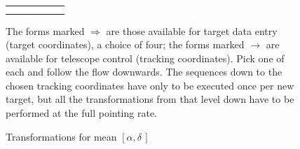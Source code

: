 \documentclass[twoside,11pt]{starlink}
\providecommand{\radec}{$[\alpha,\delta\,]$}
\begin{document}
\begin{scriptsize}
\begin{terminalv}
\begin{figure}
\begin{small}
\begin{center}
\begin{tabular}{|cccccc|}
        & & & & & \\
        & & & & & \\ \hline
      \end{tabular}
    \end{center}
  \end{small}
  \caption{Transformations for mean \radec}
  The forms marked $\Rightarrow$ are those available for target data entry (target coordinates),
  a choice of four; the forms marked $\rightarrow$ are available for telescope control (tracking
coordinates).  Pick one of each and follow the flow downwards.  The sequences down to the chosen
  tracking coordinates have only to be executed once per new target, but all the transformations
  from that level down have to be performed at the full pointing rate.
\end{figure}
\end{terminalv}
\end{scriptsize}

\newpage
\end{document}
